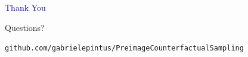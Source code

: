 \documentclass[aspectratio=169, 10pt]{beamer}
\begin{document}





\begin{frame}

\begin{center}
  {\Huge\textcolor{darkblue}{Thank You}}

  \bigskip

  {\large Questions?}

  \bigskip\bigskip

  \texttt{github.com/gabrielepintus/PreimageCounterfactualSampling}
\end{center}

\end{frame}
\end{document}
